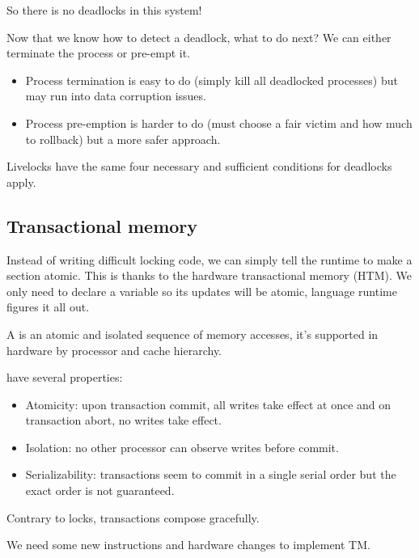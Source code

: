         So there is no deadlocks in this system!
        \begin{tcolorbox}[violet]
            Now that we know how to detect a deadlock, what to do next? We can either terminate the process or pre-empt it.
            \begin{itemize}[left=10pt, label=\textbullet]
                \item Process termination is easy to do (simply kill all deadlocked processes) but may run into data corruption issues. 
                \item Process pre-emption is harder to do (must choose a fair victim and how much to rollback) but a more safer approach.
            \end{itemize}
        \end{tcolorbox}
        Livelocks have the same four necessary and sufficient conditions for deadlocks apply.

        
    \subsection{Transactional memory}
        Instead of writing difficult locking code, we can simply tell the runtime to make a section atomic. This is thanks to the hardware transactional memory (HTM). We only need to declare a variable so its updates will be atomic, language runtime figures it all out.
        
        \begin{tcolorbox}[vert]
            A  is an atomic and isolated sequence of memory accesses, it's supported in hardware by processor and cache hierarchy.
        \end{tcolorbox}
        
        \begin{tcolorbox}[vert]
             have several properties:
            \begin{itemize}[left=10pt, label=\textbullet]
                \item Atomicity: upon transaction commit, all writes take effect at once and on transaction abort, no writes take effect. 
                \item Isolation: no other processor can observe writes before commit. 
                \item Serializability: transactions seem to commit in a single serial order but the exact order is not guaranteed.
            \end{itemize}
            Contrary to locks, transactions compose gracefully.
        \end{tcolorbox}
        We need some new instructions and hardware changes to implement TM.


